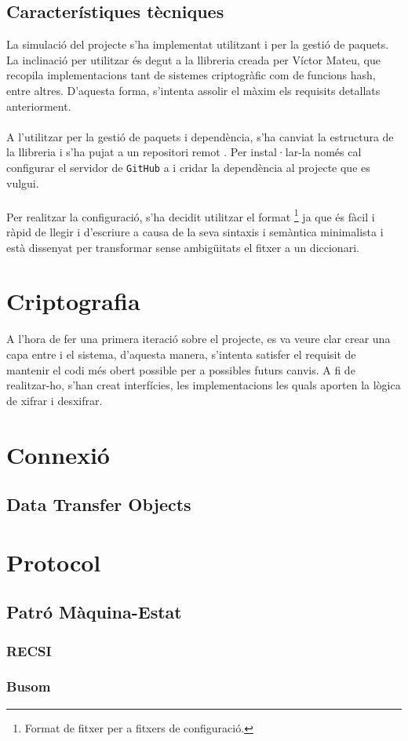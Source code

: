 \subsection{Característiques tècniques}
La simulació del projecte s'ha implementat utilitzant \texttt{\java} i \texttt{\mavenLarge} per la gestió de paquets. La inclinació per utilitzar \texttt{\java} és degut a la llibreria \ciglib creada per Víctor Mateu, que recopila implementacions tant de sistemes criptogràfic com de funcions hash, entre altres. D'aquesta forma, s'intenta assolir el màxim els requisits detallats anteriorment.
\\
\\
A l'utilitzar \maven per la gestió de paquets i dependència, s'ha canviat la estructura de la llibreria i s'ha pujat a un repositori remot \cite{ciglib}. Per instal·lar-la només cal configurar el servidor de \texttt{GitHub} a \maven i cridar la dependència al projecte que es vulgui.
\\
\\
Per realitzar la configuració, s'ha decidit utilitzar el format \toml\footnote{Format de fitxer per a fitxers de configuració.} ja que és fàcil i ràpid de llegir i d'escriure a causa de la seva sintaxis i semàntica minimalista i està dissenyat per transformar sense ambigüitats el fitxer a un diccionari.
\section{Criptografia}
A l'hora de fer una primera iteració sobre el projecte, es va veure clar crear una capa entre \ciglib i el sistema, d'aquesta manera, s'intenta satisfer el requisit de mantenir el codi més obert possible per a possibles futurs canvis. A fi de realitzar-ho, s'han creat interfícies, les implementacions les quals aporten la lògica de xifrar i desxifrar.
\section{Connexió}
\subsection{Data Transfer Objects}
\section{Protocol}
\subsection{Patró Màquina-Estat}
\subsubsection{RECSI}
\subsubsection{Busom}

